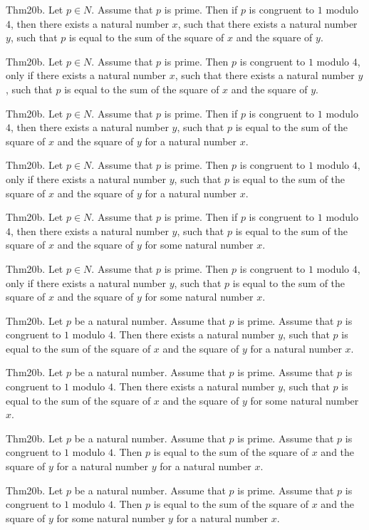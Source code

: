 \documentclass{article}
\begin{document}
Thm20b. Let $p \in N$. Assume that $p$ is prime. Then if $p$ is congruent to $1$ modulo $4$, then there exists a natural number $x$, such that there exists a natural number $y$, such that $p$ is equal to the sum of the square of $x$ and the square of $y$.

Thm20b. Let $p \in N$. Assume that $p$ is prime. Then $p$ is congruent to $1$ modulo $4$, only if there exists a natural number $x$, such that there exists a natural number $y$, such that $p$ is equal to the sum of the square of $x$ and the square of $y$.

Thm20b. Let $p \in N$. Assume that $p$ is prime. Then if $p$ is congruent to $1$ modulo $4$, then there exists a natural number $y$, such that $p$ is equal to the sum of the square of $x$ and the square of $y$ for a natural number $x$.

Thm20b. Let $p \in N$. Assume that $p$ is prime. Then $p$ is congruent to $1$ modulo $4$, only if there exists a natural number $y$, such that $p$ is equal to the sum of the square of $x$ and the square of $y$ for a natural number $x$.

Thm20b. Let $p \in N$. Assume that $p$ is prime. Then if $p$ is congruent to $1$ modulo $4$, then there exists a natural number $y$, such that $p$ is equal to the sum of the square of $x$ and the square of $y$ for some natural number $x$.

Thm20b. Let $p \in N$. Assume that $p$ is prime. Then $p$ is congruent to $1$ modulo $4$, only if there exists a natural number $y$, such that $p$ is equal to the sum of the square of $x$ and the square of $y$ for some natural number $x$.

Thm20b. Let $p$ be a natural number. Assume that $p$ is prime. Assume that $p$ is congruent to $1$ modulo $4$. Then there exists a natural number $y$, such that $p$ is equal to the sum of the square of $x$ and the square of $y$ for a natural number $x$.

Thm20b. Let $p$ be a natural number. Assume that $p$ is prime. Assume that $p$ is congruent to $1$ modulo $4$. Then there exists a natural number $y$, such that $p$ is equal to the sum of the square of $x$ and the square of $y$ for some natural number $x$.

Thm20b. Let $p$ be a natural number. Assume that $p$ is prime. Assume that $p$ is congruent to $1$ modulo $4$. Then $p$ is equal to the sum of the square of $x$ and the square of $y$ for a natural number $y$ for a natural number $x$.

Thm20b. Let $p$ be a natural number. Assume that $p$ is prime. Assume that $p$ is congruent to $1$ modulo $4$. Then $p$ is equal to the sum of the square of $x$ and the square of $y$ for some natural number $y$ for a natural number $x$.
\end{document}
